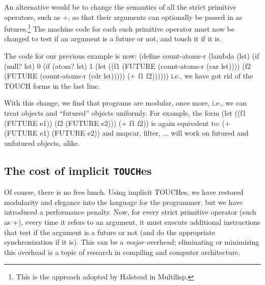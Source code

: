 An alternative would be to change the semantics of all the strict primitive
operators, such as {\cf +}, so that their arguments can optionally be passed
in as futures.\footnote{
 This is the approach adopted by Halstead in Multilisp.
}
 The machine code for each such primitive operator must now be
changed to test if an argument is a future or not, and touch it if it is.

The code for our previous example is now:
\beginlisp
(define count-atoms-r (lambda (lst)
    (if (null? lst)
        0
        (if (atom? lst)
            1
            (let
                  ((f1 (FUTURE (count-atoms-r (car lst))))
                   (f2 (FUTURE (count-atoms-r (cdr lst)))))
              (+ f1 f2))))))
\endlisp
i.e., we have got rid of the {\cf TOUCH} forms in the last line.

With this change, we find that programs are modular, once more, i.e., we can
treat objects and ``futured'' objects uniformly.  For example, the form
\beginlisp
(let
      ((f1 (FUTURE e1))
       (f2 (FUTURE e2)))
  (+ f1 f2))
\endlisp
is again equivalent to:
\beginlisp
(+ (FUTURE e1) (FUTURE e2))
\endlisp
and {\cf mapcar}, {\cf filter}, ... will work on futured and unfutured
objects, alike.

\subsection{The cost of implicit {\tt TOUCH}es}

Of course, there is no free lunch.  Using implicit {\cf TOUCH}es, we have
restored modularity and elegance into the language for the programmer, but we
have introduced a performance penalty.  Now, for every strict primitive
operator (such as {\cf +}), every time it refers to an argument, it must
execute additional instructions that test if the argument is a future or not
(and do the appropriate synchronization if it is).  This can be a {\em
major\/} overhead; eliminating or minimizing this overhead is a topic of
research in compiling and computer architecture.

